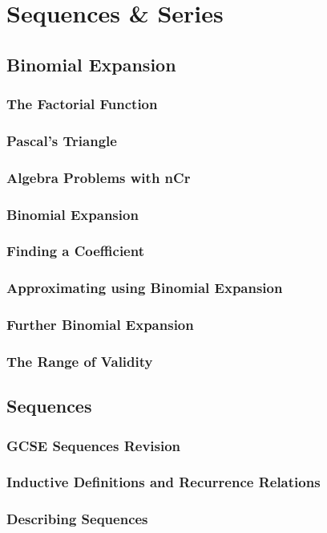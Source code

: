 \documentclass[../alevelmaths.tex]{subfiles}
\begin{document}
\chapter{Sequences \& Series}
\section{Binomial Expansion}
\subsection*{The Factorial Function}
\subsection*{Pascal's Triangle}
\subsection*{Algebra Problems with nCr}
\subsection*{Binomial Expansion}
\subsection*{Finding a Coefficient}
\subsection*{Approximating using Binomial Expansion}
\subsection*{Further Binomial Expansion}
\subsection*{The Range of Validity}
\section{Sequences}
\subsection*{GCSE Sequences Revision}
\subsection*{Inductive Definitions and Recurrence Relations}
\subsection*{Describing Sequences}
\end{document}
